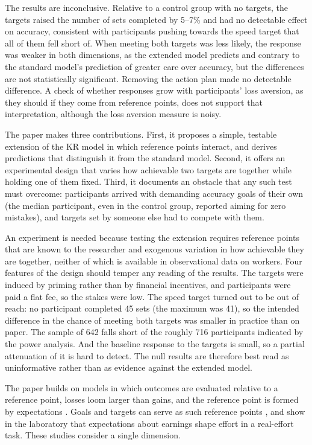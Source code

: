 \documentclass[12pt, letterpaper]{article}
\begin{document}
The results are inconclusive. Relative to a control group with no targets, the targets raised the number of sets completed by 5--7\% and had no detectable effect on accuracy, consistent with participants pushing towards the speed target that all of them fell short of. When meeting both targets was less likely, the response was weaker in both dimensions, as the extended model predicts and contrary to the standard model's prediction of greater care over accuracy, but the differences are not statistically significant. Removing the action plan made no detectable difference. A check of whether responses grow with participants' loss aversion, as they should if they come from reference points, does not support that interpretation, although the loss aversion measure is noisy.

The paper makes three contributions. First, it proposes a simple, testable extension of the KR model in which reference points interact, and derives predictions that distinguish it from the standard model. Second, it offers an experimental design that varies how achievable two targets are together while holding one of them fixed. Third, it documents an obstacle that any such test must overcome: participants arrived with demanding accuracy goals of their own (the median participant, even in the control group, reported aiming for zero mistakes), and targets set by someone else had to compete with them.

An experiment is needed because testing the extension requires reference points that are known to the researcher and exogenous variation in how achievable they are together, neither of which is available in observational data on workers. Four features of the design should temper any reading of the results. The targets were induced by priming rather than by financial incentives, and participants were paid a flat fee, so the stakes were low. The speed target turned out to be out of reach: no participant completed 45 sets (the maximum was 41), so the intended difference in the chance of meeting both targets was smaller in practice than on paper. The sample of 642 falls short of the roughly 716 participants indicated by the power analysis. And the baseline response to the targets is small, so a partial attenuation of it is hard to detect. The null results are therefore best read as uninformative rather than as evidence against the extended model.

The paper builds on models in which outcomes are evaluated relative to a reference point, losses loom larger than gains, and the reference point is formed by expectations \parencite{kahneman.1979.prospecttheory,tversky.1991.lossaversion,koszegi.2006.modelreferencedependenta}. Goals and targets can serve as such reference points \parencite{heath.1999.goalsreference,vonrechenberg.2016.goalsreference}, and \textcite{abeler.2011.referencepoints} show in the laboratory that expectations about earnings shape effort in a real-effort task. These studies consider a single dimension.
\end{document}
